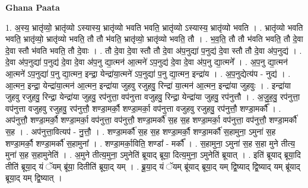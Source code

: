 \documentclass[17pt]{extarticle}
\begin{document}
\textbf{Ghana Paata } \newline

1. अ॒स्य॒ भ्रातृ॑व्यो॒ भ्रातृ॑व्यो ऽस्यास्य॒ भ्रातृ॑व्यो भवति भवति॒ भ्रातृ॑व्यो ऽस्यास्य॒ भ्रातृ॑व्यो भवति । . भ्रातृ॑व्यो भवति भवति॒ भ्रातृ॑व्यो॒ भ्रातृ॑व्यो भवति॒ तौ तौ भ॑वति॒ भ्रातृ॑व्यो॒ भ्रातृ॑व्यो भवति॒ तौ । . भ॒व॒ति॒ तौ तौ भ॑वति भवति॒ तौ दे॒वा दे॒वा स्तौ भ॑वति भवति॒ तौ दे॒वाः । . तौ दे॒वा दे॒वा स्तौ तौ दे॒वा अ॑प॒नुद्या॑ प॒नुद्य॑ दे॒वा स्तौ तौ दे॒वा अ॑प॒नुद्य॑ । . दे॒वा अ॑प॒नुद्या॑ प॒नुद्य॑ दे॒वा दे॒वा अ॑प॒नु द्या॒त्मन॑ आ॒त्मने॑ ऽप॒नुद्य॑ दे॒वा दे॒वा अ॑प॒नु द्या॒त्मने᳚ । . अ॒प॒नु द्या॒त्मन॑ आ॒त्मने॑ ऽप॒नुद्या॑ प॒नु द्या॒त्मन॒ इन्द्रा॒ येन्द्रा॑या॒त्मने॑ ऽप॒नुद्या॑ प॒नु द्या॒त्मन॒ इन्द्रा॑य । . अ॒प॒नुद्येत्य॑प - नुद्य॑ । . आ॒त्मन॒ इन्द्रा॒ येन्द्रा॑या॒त्मन॑ आ॒त्मन॒ इन्द्रा॑या जुहवु रजुहवु॒ रिन्द्रा॑ या॒त्मन॑ आ॒त्मन॒ इन्द्रा॑या जुहवुः । . इन्द्रा॑या जुहवु रजुहवु॒ रिन्द्रा॒ येन्द्रा॑या जुहवु॒ रप॑नुत्ता॒ वप॑नुत्ता वजुहवु॒ रिन्द्रा॒ येन्द्रा॑या जुहवु॒ रप॑नुत्तौ । . अ॒जु॒ह॒वु॒ रप॑नुत्ता॒ वप॑नुत्ता वजुहवु रजुहवु॒ रप॑नुत्तौ॒ शण्डा॒मर्कौ॒ शण्डा॒मर्का॒ वप॑नुत्ता वजुहवु रजुहवु॒ रप॑नुत्तौ॒ शण्डा॒मर्कौ᳚ । . अप॑नुत्तौ॒ शण्डा॒मर्कौ॒ शण्डा॒मर्का॒ वप॑नुत्ता॒ वप॑नुत्तौ॒ शण्डा॒मर्कौ॑ स॒ह स॒ह शण्डा॒मर्का॒ वप॑नुत्ता॒ वप॑नुत्तौ॒ शण्डा॒मर्कौ॑ स॒ह । . अप॑नुत्ता॒वित्यप॑ - नु॒त्तौ॒ । . शण्डा॒मर्कौ॑ स॒ह स॒ह शण्डा॒मर्कौ॒ शण्डा॒मर्कौ॑ स॒हामुना॒ ऽमुना॑ स॒ह शण्डा॒मर्कौ॒ शण्डा॒मर्कौ॑ स॒हामुना᳚ । . शण्डा॒मर्का॒विति॒ शण्डा᳚ - मर्कौ᳚ । . स॒हामुना॒ ऽमुना॑ स॒ह स॒हा मुने तीत्य॒ मुना॑ स॒ह स॒हामुनेति॑ । . अ॒मुने तीत्य॒मुना॒ ऽमुनेति॑ ब्रूयाद् ब्रूया॒ दित्य॒मुना॒ ऽमुनेति॑ ब्रूयात् । . इति॑ ब्रूयाद् ब्रूया॒दि तीति॑ ब्रूया॒द् यं ॅयम् ब्रू॑या॒ दितीति॑ ब्रूया॒द् यम् । . ब्रू॒या॒द् यं ॅयम् ब्रू॑याद् ब्रूया॒द् यम् द्वि॒ष्याद् द्वि॒ष्याद् यम् ब्रू॑याद् ब्रूया॒द् यम् द्वि॒ष्यात् । \newline
\end{document}
